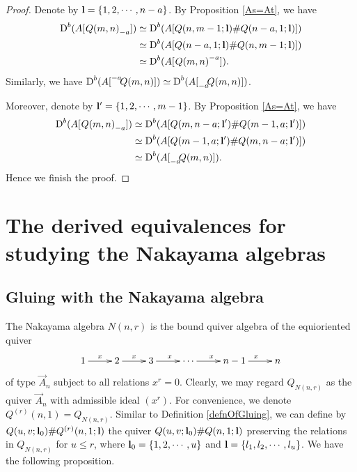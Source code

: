\documentclass[a4paper, reqno]{amsart}
\theoremstyle{definition}
\theoremstyle{remark}
\numberwithin{equation}{section}
\begin{document}
\begin{proof}
Denote by ${\bf{l}}=\{1,2,\cdots,n-a\}$. By Proposition \ref{As=At}, we have \begin{align*}
    \textup{D}^{b}(A[\;{\vphantom{Q(m,n)}}\negmedspace{Q(m,n)}_{-a}])&\simeq \textup{D}^{b}(A[Q(n,m-1;{\bf{l}})\#Q(n-a,1;{\bf{l}})])\\
    &\simeq\textup{D}^{b}(A[Q(n-a,1;{\bf{l}})\#Q(n,m-1;{\bf{l}})])\\
    &\simeq \textup{D}^{b}(A[\;{\vphantom{Q(m,n)}}\negmedspace{Q(m,n)}^{-a}]).
\end{align*}
Similarly, we have $\textup{D}^{b}(A[{\vphantom{Q(m,n)}}^{-a}\negmedspace{Q(m,n)}]) \simeq \textup{D}^{b}(A[{\vphantom{Q(m,n)}}_{-a}\negmedspace{Q(m,n)}])$. 

Moreover, denote by ${\bf{l}'}=\{1,2,\cdots,m-1\}$. By Proposition \ref{As=At}, we have \begin{align*}
    \textup{D}^{b}(A[\;{\vphantom{Q(m,n)}}\negmedspace{Q(m,n)}_{-a}])&\simeq \textup{D}^{b}(A[Q(m,n-a;{\bf{l}'})\#Q(m-1,a;{\bf{l}'})])\\
    &\simeq\textup{D}^{b}(A[Q(m-1,a;{\bf{l}'})\#Q(m,n-a;{\bf{l}'})])\\
    &\simeq \textup{D}^{b}(A[{\vphantom{Q(m,n)}}_{-a}\negmedspace{Q(m,n)}]).
\end{align*}
Hence we finish the proof.
\end{proof}



\section{The derived equivalences for studying the Nakayama algebras}\label{Sect4}

\subsection{Gluing with the Nakayama algebra}
The Nakayama algebra $N(n,r)$ is the bound quiver algebra of the equioriented quiver
$$\xymatrix{1\ar[r]^{x}&2\ar[r]^{x}&3\ar[r]^{x}&\cdots\ar[r]^{x}&n-1\ar[r]^{x}&n}$$
of type $\vec{A}_n$ subject to all relations $x^r=0$. Clearly, we may regard $Q_{N(n,r)}$ as the quiver $\vec{A}_n$ with admissible ideal $(x^r)$. For convenience, we denote $Q^{(r)}(n,1)=Q_{N(n,r)}$. Similar to Definition \ref{defnOfGluing}, we can define by $Q(u,v;{\bf l}_0)\#Q^{(r)}(n,1;{\bf l})$ the quiver $Q(u,v;{\bf l}_0)\#Q(n,1;{\bf l})$ preserving the relations in $Q_{N(n,r)}$ for $u\leq r$, where ${\bf l}_0=\{1,2,\cdots,u\}$ and ${\bf l}=\{l_1,l_2,\cdots,l_u\}$. We have the following proposition.
\end{document}

